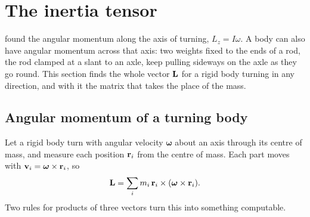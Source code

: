 \section{The inertia tensor}
\label{sec:ro-tensor}

 found the angular momentum along the axis of turning,
$L_z = I\omega$. A body can also have angular momentum across that axis:
two weights fixed to the ends of a rod, the rod clamped at a slant to an
axle, keep pulling sideways on the axle as they go round. This section
finds the whole vector $\bm{\mathrm{L}}$ for a rigid body turning in any direction,
and with it the matrix that takes the place of the mass.

\subsection*{Angular momentum of a turning body}

Let a rigid body turn with angular velocity $\boldsymbol{\omega}$ about an
axis through its centre of mass, and measure each position $\bm{\mathrm{r}}_i$ from
the centre of mass. Each part moves with $\bm{\mathrm{v}}_i = \boldsymbol{\omega}
\times\bm{\mathrm{r}}_i$, so
\begin{equation*}
   \bm{\mathrm{L}} = \sum_i m_i\,\bm{\mathrm{r}}_i\times(\boldsymbol{\omega}\times\bm{\mathrm{r}}_i) .
\end{equation*}
Two rules for products of three vectors turn this into something
computable.

